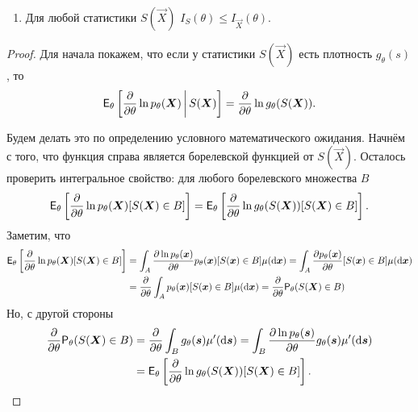 \begin{enumerate}[resume]
	\item Для любой статистики $S(\vec{X})$ $I_{S}(\theta) \leq I_{\vec{X}}(\theta)$.
\end{enumerate}
\begin{proof}
	Для начала покажем, что если у статистики $S(\vec{X})$ есть плотность $g_{\theta}(s)$, то
	\[
		\operatorname{\mathsf{E}}_{\theta}\left[\pdv{\theta}\ln p_{\theta}(\bm{X})\,\middle|\, S(\bm{X})\right] = \pdv{\theta}\ln g_{\theta}(S(\bm{X})).
	\]
	
	Будем делать это по определению условного математического ожидания. Начнём с того, что функция справа является борелевской функцией от $S(\vec{X})$. Осталось проверить интегральное свойство: для любого борелевского множества $B$
	\[
		\operatorname{\mathsf{E}}_{\theta}\left[\pdv{\theta}\ln p_{\theta}(\bm{X})[S(\bm{X}) \in B]\right]
		= \operatorname{\mathsf{E}}_{\theta}\left[\pdv{\theta}\ln g_{\theta}(S(\bm{X})) [S(\bm{X}) \in B]\right].
	\]
	Заметим, что
	\begin{align*}
		\operatorname{\mathsf{E}}_{\theta}\left[\pdv{\theta}\ln p_{\theta}(\bm{X})[S(\bm{X}) \in B]\right]
		&= \int_{A} \frac{\partial \ln p_{\theta}(\bm{x})}{\partial \theta} p_{\theta}(\bm{x}) [S(\bm{x}) \in B] \mu(\mathop{}\!\mathrm{d} \bm{x})
		= \int_{A} \frac{\partial p_{\theta}(\bm{x})}{\partial \theta} [S(\bm{x}) \in B] \mu(\mathop{}\!\mathrm{d} \bm{x}) \\
		&= \pdv{\theta} \int_{A} p_{\theta}(\bm{x}) [S(\bm{x}) \in B] \mu(\mathop{}\!\mathrm{d} \bm{x})
		= \pdv{\theta} \mathsf{P}_{\theta}(S(\bm{X}) \in B)
	\end{align*}
	Но, с другой стороны
	\begin{align*}
		\pdv{\theta} \mathsf{P}_{\theta}(S(\bm{X}) \in B)
		&= \pdv{\theta} \int_{B} g_{\theta}(\bm{s}) \mu'(\mathop{}\!\mathrm{d} \bm{s})
		= \int_{B} \frac{\partial \ln p_{\theta}(\bm{s})}{\partial \theta} g_{\theta}(\bm{s}) \mu'(\mathop{}\!\mathrm{d} \bm{s}) \\
		&= \operatorname{\mathsf{E}}_{\theta}\left[\pdv{\theta}\ln g_{\theta}(S(\bm{X})) [S(\bm{X}) \in B]\right].
	\end{align*}
	

\end{proof}

